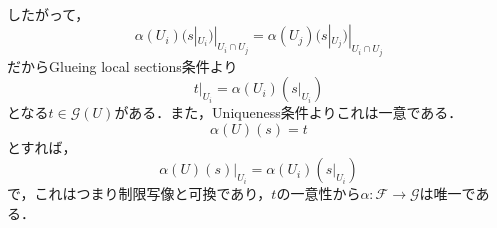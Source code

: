 {\begin{align*}
  \end{align*}
  したがって，
  \begin{equation*}
    \alpha(U_{i})(s|_{U_{i}})|_{U_{i}\cap U_{j}} = \alpha(U_{j})(s|_{U_{j}})|_{U_{i}\cap U_{j}}
  \end{equation*}
  だからGlueing local sections条件より
  \begin{equation*}
    t|_{U_{i}} = \alpha(U_{i})(s|_{U_{i}})
  \end{equation*}
  となる$t\in \mathcal{G}(U)$がある．また，Uniqueness条件よりこれは一意である．
  \begin{equation*}
    \alpha(U)(s) = t
  \end{equation*}
  とすれば，
  \begin{equation*}
    \alpha(U)(s)|_{U_{i}} = \alpha(U_{i})(s|_{U_{i}})
  \end{equation*}
  で，これはつまり制限写像と可換であり，$t$の一意性から$\alpha:\mathcal{F}\to \mathcal{G}$は唯一である．
}

